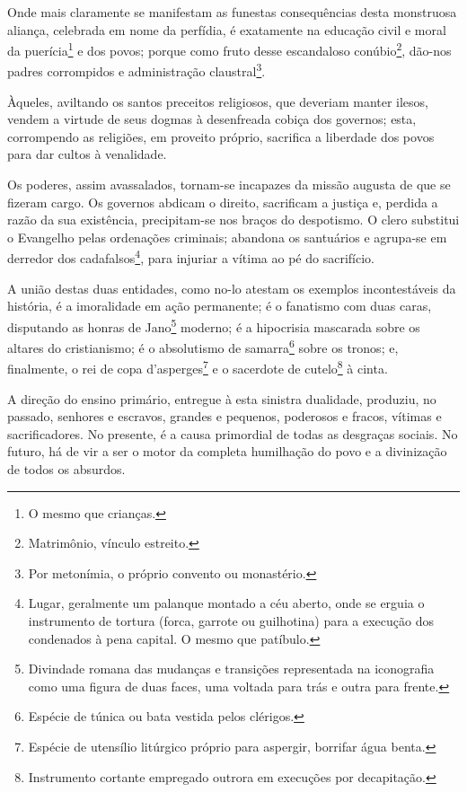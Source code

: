 Onde mais claramente se manifestam as funestas consequências desta
monstruosa aliança, celebrada em nome da perfídia, é exatamente na
educação civil e moral da puerícia\footnote{O mesmo que crianças.} e
dos povos; porque como fruto desse escandaloso conúbio\footnote{
  Matrimônio, vínculo estreito.}, dão-nos padres corrompidos e
administração claustral\footnote{Por metonímia, o próprio convento ou
  monastério.}.

Àqueles, aviltando os santos preceitos religiosos, que deveriam manter
ilesos, vendem a virtude de seus dogmas à desenfreada cobiça dos
governos; esta, corrompendo as religiões, em proveito próprio, sacrifica
a liberdade dos povos para dar cultos à venalidade.

Os poderes, assim avassalados, tornam-se incapazes da missão augusta de
que se fizeram cargo. Os governos abdicam o direito, sacrificam a
justiça e, perdida a razão da sua existência, precipitam-se nos braços
do despotismo. O clero substitui o Evangelho pelas ordenações criminais;
abandona os santuários e agrupa-se em derredor dos
cadafalsos\footnote{Lugar, geralmente um palanque montado a céu
  aberto, onde se erguia o instrumento de tortura (forca, garrote ou
  guilhotina) para a execução dos condenados à pena capital. O mesmo que
  patíbulo.\label{cadafalso}}, para injuriar a vítima ao pé do sacrifício.

A união destas duas entidades, como no-lo atestam os exemplos
incontestáveis da história, é a imoralidade em ação permanente; é o
fanatismo com duas caras, disputando as honras de Jano\footnote{
  Divindade romana das mudanças e transições representada na iconografia
  como uma figura de duas faces, uma voltada para trás e outra para
  frente.} moderno; é a hipocrisia mascarada sobre os altares do
cristianismo; é o absolutismo de samarra\footnote{Espécie de túnica ou
  bata vestida pelos clérigos.} sobre os tronos; e, finalmente, o rei de
copa d'asperges\footnote{Espécie de utensílio litúrgico próprio para
  aspergir, borrifar água benta.} e o sacerdote de cutelo\footnote{
  Instrumento cortante empregado outrora em execuções por decapitação.}
à cinta.

A direção do ensino primário, entregue à esta sinistra dualidade,
produziu, no passado, senhores e escravos, grandes e pequenos, poderosos
e fracos, vítimas e sacrificadores. No presente, é a causa primordial de
todas as desgraças sociais. No futuro, há de vir a ser o motor da
completa humilhação do povo e a divinização de todos os absurdos.

